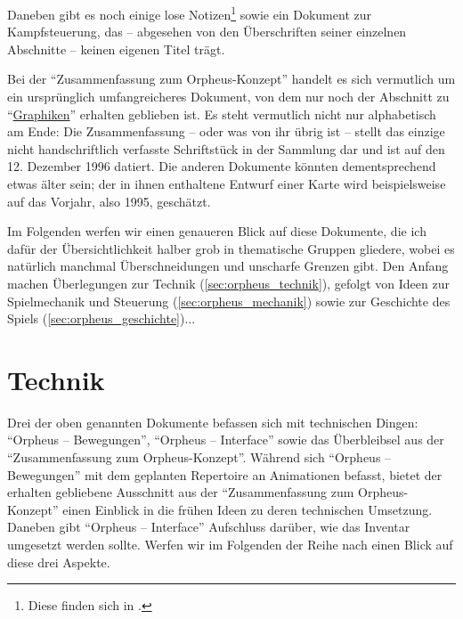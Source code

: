 \documentclass[a5paper,pagesize]{scrbook}
\begin{document}
\noindent Daneben gibt es noch einige lose Notizen\footnote{Diese finden sich in \autocite{orpheus_b_scribbles}.} sowie ein Dokument zur Kampfsteuerung,\autocite{orpheus_kampfsteuerung} das -- abgesehen von den Überschriften seiner einzelnen Abschnitte -- keinen eigenen Titel trägt.

Bei der \enquote{Zusammenfassung zum Orpheus-Konzept} handelt es sich vermutlich um ein ursprünglich umfangreicheres Dokument, von dem nur noch der Abschnitt zu \enquote{\uline{Graphiken}} erhalten geblieben ist.\autocite[Vgl.][]{archive_orpheus}
Es steht vermutlich nicht nur alphabetisch am Ende:
Die Zusammenfassung -- oder was von ihr übrig ist -- stellt das einzige nicht handschriftlich verfasste Schriftstück in der Sammlung dar und ist auf den 12. Dezember 1996 datiert.
Die anderen Dokumente könnten dementsprechend etwas älter sein; der in ihnen enthaltene Entwurf einer Karte wird beispielsweise auf das Vorjahr, also 1995, geschätzt.\autocite{flosha_evolution}

Im Folgenden werfen wir einen genaueren Blick auf diese Dokumente, die ich dafür der Übersichtlichkeit halber grob in thematische Gruppen gliedere, wobei es natürlich manchmal Überschneidungen und unscharfe Grenzen gibt.
Den Anfang machen Überlegungen zur Technik (\autoref{sec:orpheus_technik}), gefolgt von Ideen zur Spielmechanik und Steuerung (\autoref{sec:orpheus_mechanik}) sowie zur Geschichte des Spiels (\autoref{sec:orpheus_geschichte})...


\section{Technik}\label{sec:orpheus_technik}
Drei der oben genannten Dokumente befassen sich mit technischen Dingen:
\enquote{Orpheus -- Bewegungen}, \enquote{Orpheus -- Interface} sowie das Überbleibsel aus der \enquote{Zusammenfassung zum Orpheus-Konzept}.
Während sich \enquote{Orpheus -- Bewegungen} mit dem geplanten Repertoire an Animationen befasst, bietet der erhalten gebliebene Ausschnitt aus der \enquote{Zusammenfassung zum Orpheus-Konzept} einen Einblick in die frühen Ideen zu deren technischen Umsetzung.
Daneben gibt \enquote{Orpheus -- Interface} Aufschluss darüber, wie das Inventar umgesetzt werden sollte.
Werfen wir im Folgenden der Reihe nach einen Blick auf diese drei Aspekte.


\end{document}
